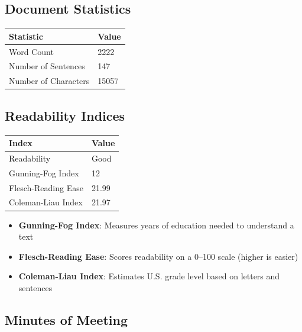 \documentclass[12pt,a4paper]{article}
\begin{document}
\subsection*{Document Statistics}
\begin{tabular}{|l|l|}
\hline
\textbf{Statistic}        & \textbf{Value} \\ \hline
Word Count                & 2222          \\ \hline
Number of Sentences       & 147           \\ \hline
Number of Characters      & 15057         \\ \hline

\end{tabular}

\subsection*{Readability Indices}
\caption{} \label{tab:List of Readability Indices}
\begin{tabular}{|l|l|}

\hline
\textbf{Index}            & \textbf{Value} \\ \hline
Readability               & Good           \\ \hline
Gunning-Fog Index         & 12           \\ \hline
Flesch-Reading Ease       & 21.99          \\ \hline
Coleman-Liau Index        & 21.97          \\ \hline

\end{tabular}
\begin{itemize}
    \item \textbf{Gunning-Fog Index}: Measures years of education needed to understand a text
    \item \textbf{Flesch-Reading Ease}: Scores readability on a 0--100 scale (higher is easier)
    \item \textbf{Coleman-Liau Index}: Estimates U.S. grade level based on letters and sentences
\end{itemize}



\clearpage
\subsection*{Minutes of Meeting}
\end{document}

